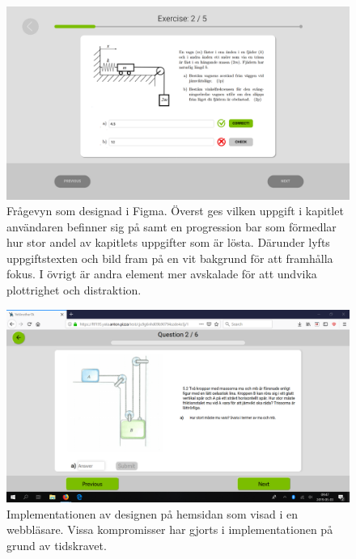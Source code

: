 \begin{center}
\begin{figure}[H]
    \centering
    \includegraphics[width=1.0\textwidth]{images/resultpictures/figma_exerciseview.png}
    \caption{Frågevyn som designad i Figma. Överst ges vilken uppgift i kapitlet användaren befinner sig på samt en progression bar som förmedlar hur stor andel av kapitlets uppgifter som är lösta. Därunder lyfts uppgiftstexten och bild fram på en vit bakgrund för att framhålla fokus. I övrigt är andra element mer avskalade för att undvika plottrighet och distraktion.}
    \label{fig:raket2}
\end{figure}
\end{center}

\begin{center}
\begin{figure}[H]
    \centering
    \includegraphics[width=1.0\textwidth]{images/resultpictures/fragevy.png}
    \caption{Implementationen av designen på hemsidan som visad i en webbläsare. Vissa kompromisser har gjorts i implementationen på grund av tidskravet.}
    \label{fig:raket3}
\end{figure}
\end{center}


